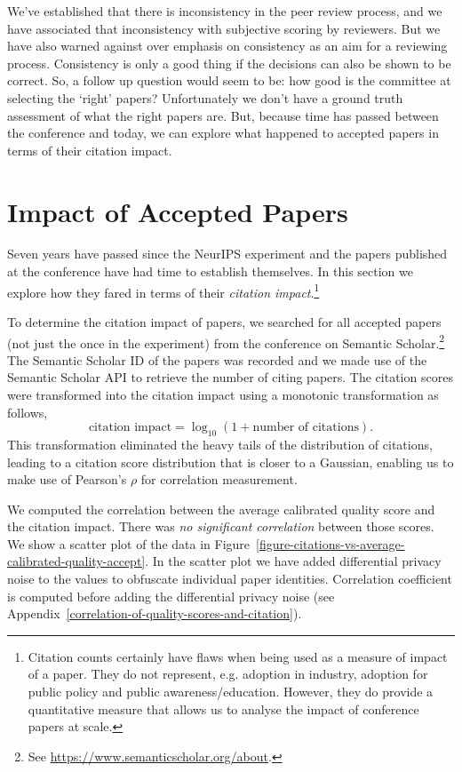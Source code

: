 \documentclass[twoside]{article}
\begin{document}
We've established that there is inconsistency in the peer review
process, and we have associated that inconsistency with subjective
scoring by reviewers. But we have also warned against over emphasis on
consistency as an aim for a reviewing process. Consistency is only a
good thing if the decisions can also be shown to be correct. So, a
follow up question would seem to be: how good is the committee at
selecting the `right' papers? Unfortunately we don't have a ground
truth assessment of what the right papers are. But, because time has
passed between the conference and today, we can explore what happened
to accepted papers in terms of their citation impact.

\section{Impact of Accepted Papers}

Seven years have passed since the NeurIPS experiment and the papers
published at the conference have had time to establish themselves. In
this section we explore how they fared in terms of their
\emph{citation impact}.\footnote{Citation counts certainly have flaws
  when being used as a measure of impact of a paper. They do not
  represent, e.g. adoption in industry, adoption for public policy and
  public awareness/education. However, they do provide a quantitative
  measure that allows us to analyse the impact of conference papers at
  scale.}

To determine the citation impact of papers, we searched for all
accepted papers (not just the once in the experiment) from the conference on Semantic Scholar.\footnote{See
  \url{https://www.semanticscholar.org/about}.}
The Semantic Scholar ID of the papers was recorded and we made use of
the Semantic Scholar API to retrieve the number of citing papers. The
citation scores were transformed into the citation impact using a
monotonic transformation as follows,
$$
\text{citation impact} = \log_{10} (1 + \text{number of citations}).
$$
This transformation eliminated the heavy tails of the distribution
of citations, leading to a citation score distribution that is closer
to a Gaussian, enabling us to make use of Pearson's $\rho$ for
correlation measurement.

We computed the correlation between the average calibrated quality
score and the citation impact. There was \emph{no significant
  correlation} between those scores. We show a scatter plot of the
data in Figure~\ref{figure-citations-vs-average-calibrated-quality-accept}. In the
scatter plot we have added differential privacy noise to the values
 to obfuscate individual paper
identities. Correlation coefficient is computed before adding the
differential privacy noise (see Appendix~\ref{correlation-of-quality-scores-and-citation}).
\end{document}
